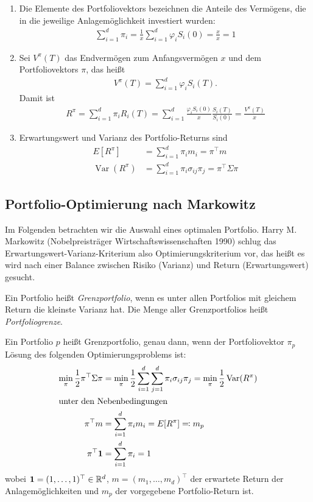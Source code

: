 \documentclass[a4paper,twoside,DIV15,BCOR12mm]{scrbook}
\DeclareMathOperator{\Var}{Var}
\begin{document}
\begin{bemerkung}
\begin{enumerate}
\item Die Elemente des Portfoliovektors bezeichnen die Anteile des Vermögens, die in die jeweilige Anlagemöglichkeit investiert wurden:
\begin{align*}
\sum_{i=1}^d \pi_i = \frac1x \sum_{i=1}^d \varphi_iS_i(0) = \frac xx = 1
\end{align*}
\item Sei $V^\pi(T)$ das Endvermögen zum Anfangsvermögen $x$ und dem Portfoliovektors $\pi$, das heißt
\begin{align*}
V^\pi(T) = \sum_{i=1}^d\varphi_iS_i(T).
\end{align*}
Damit ist
\begin{align*}
R^\pi = \sum_{i=1}^d \pi_iR_i(T) = \sum_{i=1}^d \frac{\varphi_iS_i(0)}x \frac{S_i(T)}{S_i(0)} = \frac{V^\pi(T)}x
\end{align*}
\item Erwartungswert und Varianz des Portfolio-Returns sind 
\begin{align*}
E[R^\pi] &= \sum_{i=1}^d \pi_im_i = \pi^\top m \\
\Var(R^\pi) &= \sum_{i=1}^d \pi_i\sigma_{ij}\pi_j = \pi^\top \Sigma \pi
\end{align*}
\end{enumerate}
\end{bemerkung}

\subsection{Portfolio-Optimierung nach Markowitz}
Im Folgenden betrachten wir die Auswahl eines optimalen Portfolio. Harry M. Markowitz (Nobelpreisträger Wirtschaftswissenschaften 1990) schlug das Erwartungswert-Varianz-Kriterium also Optimierungskriterium vor, das heißt es wird nach einer Balance zwischen Risiko (Varianz) und Return (Erwartungswert) gesucht.

\begin{definition}
Ein Portfolio heißt \emph{Grenzportfolio}, wenn es unter allen Portfolios mit gleichem Return die kleinste Varianz hat. Die Menge aller Grenzportfolios heißt \emph{Portfoliogrenze}.
\end{definition}

\begin{satz}
Ein Portfolio $p$ heißt Grenzportfolio, genau dann, wenn der Portfoliovektor $\pi_p$ Lösung des folgenden Optimierungsproblems ist:
\begin{align*}
\min_{\pi} \frac 12 \pi^\top \Sigma \pi &= \min_\pi \frac 12 \sum_{i=1}^d\sum_{j=1}^d \pi_i \sigma_{ij}\pi_j = \min_\pi \frac 12 \Var(R^\pi) \\
\intertext{unter den Nebenbedingungen}
\pi^\top m &= \sum_{i=1}^d \pi_im_i = E[R^\pi]\ad m_p \\
\pi^\top \mathbf 1 &= \sum_{i=1}^d \pi_i = 1
\end{align*}
wobei $\mathbf 1=(1,\ldots,1)^\top\in\mathbb{R}^d$, $m=(m_1,\ldots,m_d)^\top$ der erwartete Return der Anlagemöglichkeiten und $m_p$ der vorgegebene Portfolio-Return ist.
\end{satz}
\end{document}
